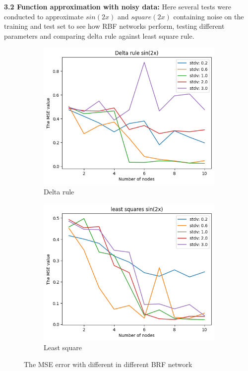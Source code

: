 \documentclass[a4paper]{article}
\begin{document}
\textbf{3.2 Function approximation with noisy data:}
Here several tests were conducted to approximate $sin(2x)$ and $square(2x)$ containing noise on the training and test set to see how RBF networks perform, testing different parameters and comparing delta rule against least square rule.

\begin{figure}[ht]
    \centering
    \begin{subfigure}{0.4\textwidth}
        \centering
        \includegraphics[width=\textwidth]{Labs/Lab 2/figures/3.2/MSE_sin(2x)_delta.png}
        \caption{Delta rule}
    \end{subfigure}
    \hfill
    \begin{subfigure}{0.4\textwidth}
        \centering
        \includegraphics[width=\textwidth]{Labs/Lab 2/figures/3.2/MSE_sin(2x)_least.png}
        \caption{Least square}
    \end{subfigure}
    \hfill
    \caption{The MSE error with different in different BRF network}
    \label{fig:different-widths-units}
\end{figure}
\end{document}
